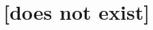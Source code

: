 \documentclass[../main.tex]{subfiles}
\begin{document}
\setcounter{chapter}{6}
\chapter{[does not exist]}
\end{document}
